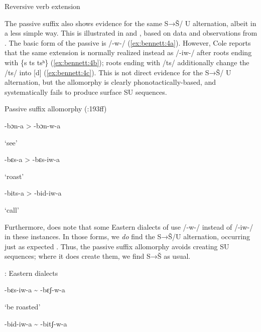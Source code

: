 \documentclass[output=paper,newtxmath,modfonts,nonflat,hidelinks]{langsci/langscibook}
\begin{document}
\ea\label{ex:bennett:3}
Reversive verb extension
\ea\label{ex:bennett:3a}

\ex\label{ex:bennett:3b}

\ex\label{ex:bennett:3c}

\z
\z

The passive suffix also shows evidence for the same S→Š/ {\longrule} U alternation, albeit in a less simple way. This is illustrated in  and , based on data and observations from \citet[193--195]{Cole1955}. The basic form of the passive is /-w-/ (\ref{ex:bennett:4a}). However, Cole reports that the same extension is normally realized instead as /-iw-/ after roots ending with \{s ts tsʰ\} (\ref{ex:bennett:4b}); roots ending with /ts/ additionally change the /ts/ into [d] (\ref{ex:bennett:4c}). This is not direct evidence for the S→Š/ {\longrule} U alternation, but the allomorphy is clearly phonotactically-based, and systematically fails to produce surface SU sequences.

\ea\label{ex:bennett:4}
Passive suffix allomorphy (\citealt{Cole1955}:193ff)
\ea\label{ex:bennett:4a}

-bɔn-a  >  -bɔn-w-a

     ‘see’
\ex\label{ex:bennett:4b}

-bɛs-a  >  -bɛs-iw-a

     ‘roast’
\ex\label{ex:bennett:4c}

-bits-a  >  -bid-iw-a

     ‘call’\\
\z
\z

Furthermore, \citet{Cole1955} does note that some Eastern dialects of  use /-w-/ instead of /-iw-/ in these instances. In those forms, we \textit{do} find the S→Š/{\longrule}U alternation, occurring just as expected . Thus, the passive suffix allomorphy avoids creating SU sequences; where it does create them, we find S→Š as usual.

\ea\label{ex:bennett:5}
: Eastern dialects \citep{Cole1955}\\
\ea\label{ex:bennett:5a}

-bɛs-iw-a {\textasciitilde} -bɛʃ-w-a

     ‘be roasted’\\
\ex\label{ex:bennett:5b}

-bid-iw-a  {\textasciitilde} -bitʃ-w-a
\end{document}
